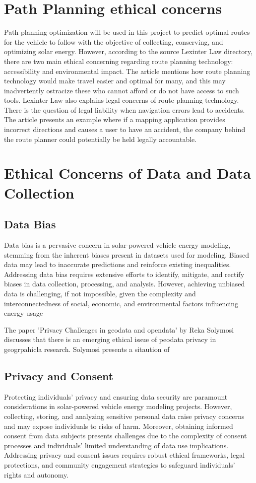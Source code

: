 \documentclass[10pt,twocolumn]{article}
\begin{document}
\section{Path Planning ethical concerns}
Path planning optimization will be used in this project to predict optimal routes for the vehicle to follow  with the objective of collecting, conserving, and optimizing solar energy. However, according to the source Lexinter Law directory, there are two main ethical concerning regarding route planning technology: accessibility and environmental impact. The article mentions how route planning technology would make travel easier and optimal for many, and this may inadvertently ostracize these who cannot afford or do not have access to such tools. Lexinter Law also explains legal concerns of route planning technology. There is the question of legal liability when navigation errors lead to accidents. The article presents an example where if a mapping application provides incorrect directions and causes a user to have an accident, the company behind the route planner could potentially be held legally accountable.

\section{Ethical Concerns of Data and Data Collection}

\subsection{Data Bias}
Data bias is a pervasive concern in solar-powered vehicle energy modeling, stemming from the inherent biases present in datasets used for modeling. Biased data may lead to inaccurate predictions and reinforce existing inequalities. Addressing data bias requires extensive efforts to identify, mitigate, and rectify biases in data collection, processing, and analysis. However, achieving unbiased data is challenging, if not impossible, given the complexity and interconnectedness of social, economic, and environmental factors influencing energy usage

The paper 'Privacy Challenges in geodata and opendata' by Reka Solymosi discusses that there is an emerging ethical issue of peodata privacy in geogrpahicla research. Solymosi presents a sitaution of 
\subsection{Privacy and Consent}
Protecting individuals' privacy and ensuring data security are paramount considerations in solar-powered vehicle energy modeling projects. However, collecting, storing, and analyzing sensitive personal data raise privacy concerns and may expose individuals to risks of harm. Moreover, obtaining informed consent from data subjects presents challenges due to the complexity of consent processes and individuals' limited understanding of data use implications. Addressing privacy and consent issues requires robust ethical frameworks, legal protections, and community engagement strategies to safeguard individuals' rights and autonomy.
\end{document}
